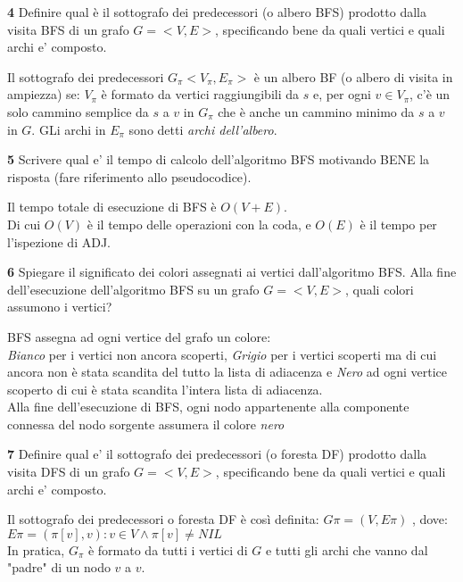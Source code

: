 \documentclass[12pt, a4paper, openany]{book}
\newcommand{\domanda}[2]{\begin{box_domanda}\textbf{#1} #2\end{box_domanda}}
\newcommand{\risposta}[1]{#1}
\newcommand{\reflibro}[1]{}%
\begin{document}
\domanda{4}{
Definire qual è il sottografo dei predecessori (o albero BFS) prodotto dalla
visita BFS di un grafo $G=<V,E>$, specificando bene da quali vertici e quali
archi e’ composto.
}
\risposta{
Il sottografo dei predecessori $G_\pi <V_\pi, E_\pi>$ è un albero BF (o albero di visita in ampiezza) se:
$V_\pi$ è formato da vertici raggiungibili da $s$ e, per ogni $v \in V_\pi$, c'è un solo cammino semplice da $s$ a $v$ in $G_\pi$ che è anche un cammino minimo da $s$ a $v$ in $G$.
GLi archi in $E_\pi$ sono detti \emph{archi dell'albero}.
}
\reflibro{“Alberi di visita in ampiezza”  pag. 502}
\domanda{5}{
Scrivere qual e’ il tempo di calcolo dell’algoritmo BFS motivando BENE la
risposta (fare riferimento allo pseudocodice).
}
\risposta{
Il tempo totale di esecuzione di BFS è $O(V + E)$.\\
Di cui $O(V)$ è il tempo delle operazioni con la coda, e $O(E)$ è il tempo per l'ispezione di ADJ.
}
\reflibro{"Analisi" pag 499}
\domanda{6}{
Spiegare il significato dei colori assegnati ai vertici dall’algoritmo BFS.
Alla fine dell’esecuzione dell’algoritmo BFS su un grafo $G=<V,E>$, quali colori assumono i vertici?
}
\risposta{
BFS assegna ad ogni vertice del grafo un colore:
\\\emph{Bianco} per i vertici non ancora scoperti, \emph{Grigio} per i vertici scoperti ma di cui ancora non è stata scandita del tutto la lista di adiacenza
e \emph{Nero} ad ogni vertice scoperto di cui è stata scandita l'intera lista di adiacenza.
\\Alla fine dell'esecuzione di BFS, ogni nodo appartenente alla componente connessa del nodo sorgente assumera il colore \emph{nero} 
}
\domanda{7}{
Definire qual e’ il sottografo dei predecessori (o foresta DF) prodotto dalla visita DFS di un grafo $G=<V,E>$,
specificando bene da quali vertici e quali archi e’ composto.
}
\risposta{
Il sottografo dei predecessori o foresta DF è così definita:
$G\pi = (V, E\pi )$ , dove:
$E\pi = {(\pi[v], v) : v \in V \land \pi[v] \neq NIL}$
\\In pratica, $G_\pi$ è formato da tutti i vertici di $G$ e tutti gli archi che vanno dal "padre" di un nodo $v$ a $v$.
}
\end{document}
